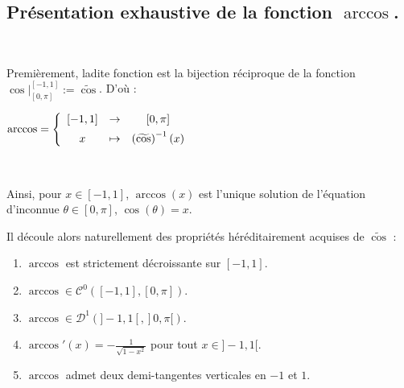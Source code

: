 \documentclass{article}
\begin{document}
\subsection{Présentation exhaustive de la fonction $\arccos$.} 

\

Premièrement, ladite fonction est la bijection réciproque de la fonction $\cos |_{[0,\pi]}^{[-1,1]} := \widetilde{\cos}$. D'où : 
\begin{center}

$\arccos = \left\{  
\begin{array}{c c c}
[-1,1] & \to & [0 , \pi] \\ [1ex]
x & \mapsto & \left( \widetilde{\cos} \right)^{-1}(x)

\end{array} 
\right.
$
\end{center}

\

Ainsi, pour $x\in [-1,1]$, $\arccos (x)$ est l'unique solution de l'équation d'inconnue $\theta \in \textstyle [0 ,\pi]$, $\cos(\theta) = x$. 

\newpage

Il découle alors naturellement des propriétés héréditairement acquises de $\widetilde{\cos}$ : 

\begin{enumerate}
    \item $\arccos$ est strictement décroissante sur $[-1,1]$.
    \item $\arccos \in \mathcal{C}^0\left([-1,1],[0 , \pi] \right)$.
    \item $\arccos \in \mathcal{D}^1\left(]-1,1[,]0 ,\pi [ \right)$.
    \item $\arccos'(x) = -\frac{1}{\sqrt{1-x^2}}$ pour tout $x\in]-1,1[$.
    \item $\arccos$ admet deux demi-tangentes verticales en $-1$ et $1$.
\end{enumerate}

\
\end{document}
